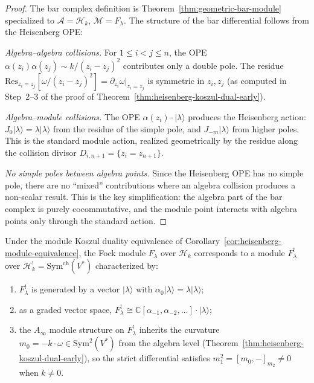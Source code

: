 \begin{proof}
The bar complex definition is Theorem~\ref{thm:geometric-bar-module}
specialized to $\mathcal{A} = \mathcal{H}_k$,
$\mathcal{M} = F_\lambda$.  The structure of the bar differential
follows from the Heisenberg OPE:

\emph{Algebra--algebra collisions.} For $1 \leq i < j \leq n$, the OPE
$\alpha(z_i)\alpha(z_j) \sim k/(z_i - z_j)^2$ contributes only a double pole.
The residue $\mathrm{Res}_{z_i = z_j}[\omega/(z_i - z_j)^2]
= \partial_{z_i}\omega|_{z_i = z_j}$ is symmetric in $z_i, z_j$
(as computed in Step~2--3 of the proof of
Theorem~\ref{thm:heisenberg-koszul-dual-early}).

\emph{Algebra--module collisions.} The OPE
$\alpha(z_i) \cdot |\lambda\rangle$ produces the Heisenberg action:
$J_0|\lambda\rangle = \lambda|\lambda\rangle$ from the
residue of the simple pole, and $J_{-m}|\lambda\rangle$
from higher poles.  This is the standard module action,
realized geometrically by the residue along the collision divisor
$D_{i,n+1} = \{z_i = z_{n+1}\}$.

\emph{No simple poles between algebra points.} Since the Heisenberg OPE
has no simple pole, there are no ``mixed'' contributions where an
algebra collision produces a non-scalar result.  This is the key
simplification: the algebra part of the bar complex is purely
cocommutative, and the module point interacts with algebra points
only through the standard action.
\end{proof}

\begin{proposition}
\label{prop:fock-koszul-dual}
Under the module Koszul duality equivalence of
Corollary~\textup{\ref{cor:heisenberg-module-equivalence}}, the Fock module
$F_\lambda$ over $\mathcal{H}_k$ corresponds to a module
$F_\lambda^!$ over
$\mathcal{H}_k^! = \mathrm{Sym}^{\mathrm{ch}}(V^*)$
characterized by:
\begin{enumerate}[label=\textup{(\roman*)}]
\item $F_\lambda^!$ is generated by a vector $|\lambda\rangle$ with
  $\alpha_0|\lambda\rangle = \lambda|\lambda\rangle$;
\item as a graded vector space,
  $F_\lambda^! \cong \mathbb{C}[\alpha_{-1}, \alpha_{-2}, \ldots]
  \cdot |\lambda\rangle$;
\item the $A_\infty$ module structure on $F_\lambda^!$ inherits the
  curvature $m_0 = -k \cdot \omega \in \mathrm{Sym}^2(V^*)$
  from the algebra level
  \textup{(}Theorem~\textup{\ref{thm:heisenberg-koszul-dual-early})},
  so the strict differential satisfies
  $m_1^2 = [m_0, -]_{m_2} \neq 0$ when $k \neq 0$.
\end{enumerate}
\end{proposition}

